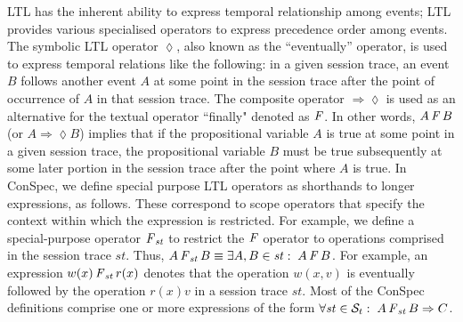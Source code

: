 \documentclass[journal,compsoc]{IEEEtran}
\begin{document}
 LTL has the inherent ability to express temporal relationship among events; LTL provides various specialised operators to express precedence order among events. The symbolic LTL operator  $\lozenge$, also known as the ``eventually''  operator, is used to express temporal relations like the following: in a given session trace, an event $B$ follows another event $A$ at some point in the session trace after the point of occurrence of $A$ in that session trace. The composite operator  $\Rightarrow \lozenge$ is used as an alternative for the textual  operator ``finally" denoted as $\operatorname{\it F}$.
   In other words, $A \operatorname{\it F} B$ (or $A \Rightarrow \lozenge B$) implies that if the propositional variable $A$ is true at some point in a given session trace, the propositional variable $B$ must be true subsequently at some later portion in the session trace after the point where $A$ is true. %
  In ConSpec, we define special purpose LTL operators as shorthands to longer expressions, as follows. These correspond to scope operators
   that specify the context within which the expression is 
  restricted.  For example, we define a special-purpose operator $\operatorname{\it F}_\mathit{st}$ to restrict the $\operatorname{\it F}$ operator to operations comprised in the session trace $\mathit{st}$. Thus, $A \operatorname{\it F}_\mathit{st} B \equiv \exists A, B \in \mathit{st}:\; A \operatorname{\it F} B$. %
  For example, an expression ${w(x)} \operatorname{\it F}_\mathit{st} {r(x)}$ denotes that the operation $w(x,v)$ is eventually followed by the operation  $r(x){v}$ in a session trace $\mathit{st}$.  Most of the ConSpec definitions comprise one or more expressions of the form $\forall \mathit{st} \in \mathcal{S}_t:\; A  \operatorname{\it F}_\mathit{st} B \Rightarrow  C$. %
\end{document}
